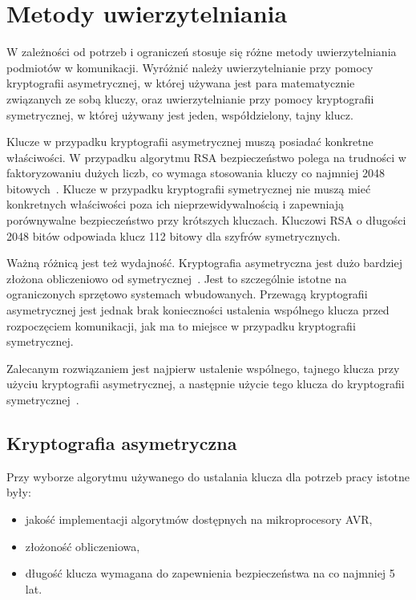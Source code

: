 \chapter{Metody uwierzytelniania}
\label{cha:metodyUwierzytelniania}

W zależności od potrzeb i ograniczeń stosuje się różne metody uwierzytelniania podmiotów w komunikacji. Wyróżnić należy uwierzytelnianie przy pomocy kryptografii asymetrycznej, w której używana jest para matematycznie związanych ze sobą kluczy, oraz uwierzytelnianie przy pomocy kryptografii symetrycznej, w której używany jest jeden, współdzielony, tajny klucz.

Klucze w przypadku kryptografii asymetrycznej muszą posiadać konkretne właściwości. W przypadku algorytmu RSA bezpieczeństwo polega na trudności w faktoryzowaniu dużych liczb, co wymaga stosowania kluczy co najmniej 2048 bitowych~\cite{Nist}. Klucze w przypadku kryptografii symetrycznej nie muszą mieć konkretnych właściwości poza ich nieprzewidywalnością i zapewniają porównywalne bezpieczeństwo przy krótszych kluczach. Kluczowi RSA o długości 2048 bitów odpowiada klucz 112 bitowy dla szyfrów symetrycznych.

Ważną różnicą jest też wydajność. Kryptografia asymetryczna jest dużo bardziej złożona obliczeniowo od symetrycznej~\cite{al2008comparative}. Jest to szczególnie istotne na ograniczonych sprzętowo systemach wbudowanych. Przewagą kryptografii asymetrycznej jest jednak brak konieczności ustalenia wspólnego klucza przed rozpoczęciem komunikacji, jak ma to miejsce w przypadku kryptografii symetrycznej.

Zalecanym rozwiązaniem jest najpierw ustalenie wspólnego, tajnego klucza przy użyciu kryptografii asymetrycznej, a następnie użycie tego klucza do kryptografii symetrycznej~\cite{al2008comparative}.

\section{Kryptografia asymetryczna}
\label{sec:kryptoAsym}

Przy wyborze algorytmu używanego do ustalania klucza dla potrzeb pracy istotne były:

\begin{itemize}
\item jakość implementacji algorytmów dostępnych na mikroprocesory AVR,
\item złożoność obliczeniowa,
\item długość klucza wymagana do zapewnienia bezpieczeństwa na co najmniej 5 lat.
\end{itemize}

